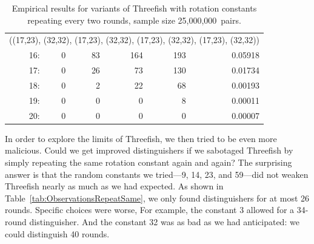 \documentclass[11pt,twoside]{article}
\begin{document}
\begin{table}[htbp]
\begin{tabular}{|r|rrrr|r|}
 \hline\hline
\multicolumn{6}{|l|}{((17,23), (32,32), (17,23), (32,32),
                      (17,23), (32,32), (17,23), (32,32))} \\ 
 16: &  0 &  83 &  164 &  193 & 0.05918  \\
 17: &  0 &  26 &  73 &  130 & 0.01734  \\
 18: &  0 &  2 &  22 &  68 & 0.00193  \\
 19: &  0 &  0 &  0 &  8 & 0.00011  \\
 20: &  0 &  0 &  0 &  0 & 0.00007  \\
 \hline\hline
\end{tabular}
  \caption{Empirical results for variants of Threefish with rotation constants repeating every two rounds, sample size 25,000,000~pairs.}
  \label{tab:ObservationsTwoRepeat256}
\end{table}

In order to explore the limits of Threefish, we then tried to be even more malicious. 
Could we get improved distinguishers if we sabotaged Threefish by simply repeating the same rotation constant again and again? The surprising answer is that the random constants we tried---9, 14, 23, and 59---did not weaken Threefish nearly as much as we had expected. As shown in Table~\ref{tab:ObservationsRepeatSame}, we only found distinguishers for at most 26 rounds. Specific choices were worse,  For example, the constant 3 allowed for a 34-round distinguisher. And the constant 32 was as bad as we had anticipated: we could distinguish 40 rounds.
\end{document}
